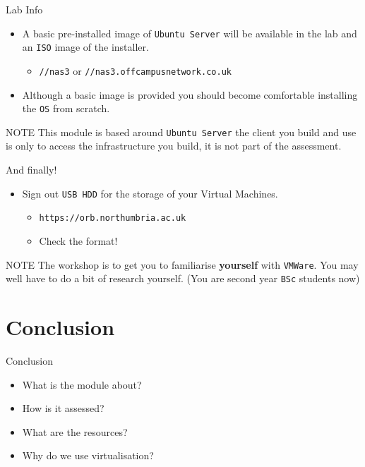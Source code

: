 \documentclass{beamer}
\begin{document}
\begin{frame}{Lab Info}
  \begin{itemize}
    \item A basic pre-installed image of \texttt{Ubuntu Server} will be available in the lab and an \texttt{ISO} image of the installer. 
      \begin{itemize}
        \item \texttt{//nas3} or \texttt{//nas3.offcampusnetwork.co.uk} 
      \end{itemize}
    \item Although a basic image is provided you should become comfortable installing the \texttt{OS} from scratch.
  \end{itemize}
  \begin{block}{NOTE}
    This module is based around \texttt{Ubuntu Server} the client you build and use is only to access the infrastructure you build, it is not part of the assessment.
  \end{block}
\end{frame}

\begin{frame}{And finally!}
  \begin{itemize}
    \item Sign out \texttt{USB HDD} for the storage of your Virtual Machines.
      \begin{itemize}
        \item \texttt{https://orb.northumbria.ac.uk} 
        \item Check the format!
      \end{itemize}
  \end{itemize}
  \begin{block}{NOTE}
    The workshop is to get you to familiarise \textbf{yourself} with \texttt{VMWare}. You may well have to do a bit of research yourself. (You are second year \texttt{BSc} students now)
  \end{block}
\end{frame}



\section*{Conclusion}
\begin{frame}{Conclusion}
  \begin{itemize}
    \item What is the module about?
    \item How is it assessed?
    \item What are the resources?
    \item Why do we use virtualisation?
  \end{itemize}
\end{frame}
\end{document}
